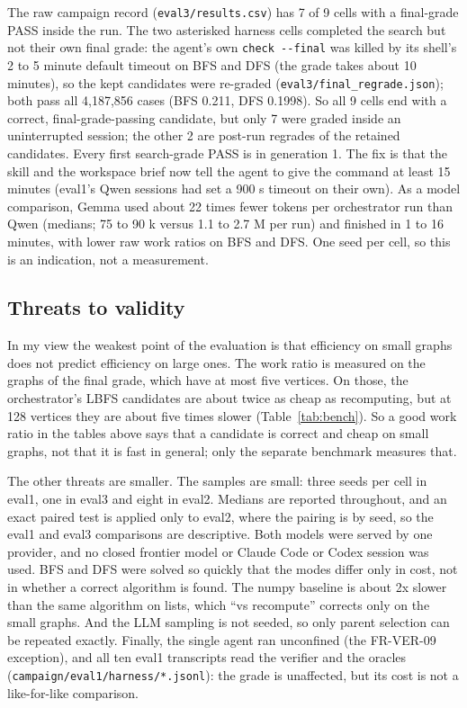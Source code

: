 The raw campaign record (\texttt{eval3/results.csv}) has 7 of 9 cells with a
final-grade PASS inside the run. The two asterisked harness cells completed the
search but not their own final grade: the
agent's own \texttt{check -{}-final} was killed by its shell's 2 to 5 minute
default timeout on BFS and DFS (the grade takes about 10 minutes), so the kept
candidates were re-graded (\texttt{eval3/final\_regrade.json}); both pass all
4{,}187{,}856 cases (BFS 0.211, DFS 0.1998). So all 9 cells end with a correct,
final-grade-passing candidate, but only 7 were graded inside an uninterrupted
session; the other 2 are post-run regrades of the retained candidates. Every
first search-grade PASS is in generation 1. The fix is that the skill and the
workspace brief now tell the agent to give the command at least 15 minutes
(eval1's Qwen sessions had set a 900 s timeout on their own). As a model
comparison, Gemma used about 22 times fewer tokens per orchestrator run than Qwen
(medians; 75 to 90 k versus 1.1 to 2.7 M per run) and finished in 1 to 16 minutes, with lower
raw work ratios on BFS and DFS. One seed per cell, so this is an indication,
not a measurement.

\subsection{Threats to validity}

In my view the weakest point of the evaluation is that efficiency on small
graphs does not predict efficiency on large ones. The work ratio is measured on
the graphs of the final grade, which have at most five vertices. On those, the
orchestrator's LBFS candidates are about twice as cheap as recomputing, but at
128 vertices they are about five times slower (Table~\ref{tab:bench}). So a good
work ratio in the tables above says that a candidate is correct and cheap on
small graphs, not that it is fast in general; only the separate benchmark
measures that.

The other threats are smaller. The samples are small: three seeds per cell in
eval1, one in eval3 and eight in eval2. Medians are reported throughout, and an
exact paired test is applied only to eval2, where the pairing is by seed, so the
eval1 and eval3 comparisons are descriptive. Both models were served by one provider,
and no closed frontier model or Claude Code or Codex session was used.
BFS and DFS were solved so quickly that the modes differ only in cost, not in
whether a correct algorithm is found. The numpy baseline is about 2x slower than
the same algorithm on lists, which ``vs recompute'' corrects only on the small
graphs. And the LLM sampling is not seeded, so only parent selection can be
repeated exactly. Finally, the single agent ran unconfined (the FR-VER-09
exception), and all ten eval1 transcripts read the verifier and the oracles
(\texttt{campaign/eval1/harness/*.jsonl}): the grade is unaffected, but its cost
is not a like-for-like comparison.

